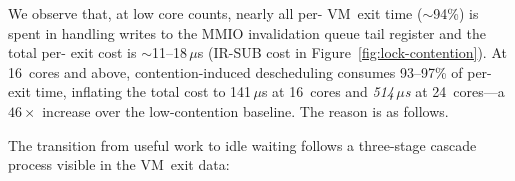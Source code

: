 We observe that, at low core counts, nearly all per- VM~exit time (${\sim}$94\%) is spent in handling writes to the MMIO invalidation queue tail register 
and the total per- exit cost is ${\sim}$11--18\,$\mu$s (IR-SUB cost in Figure~\ref{fig:lock-contention}).
At 16~cores and above, contention-induced descheduling consumes
 {93--97\%} of per- exit time, inflating the total cost to 141\,$\mu$s at 16~cores and \textit{514\,$\mu$s} at 24~cores---a $46\times$ increase over the low-contention baseline.
 The reason is as follows.



The transition from useful work to idle waiting follows a three-stage cascade process visible in the VM~exit data:


